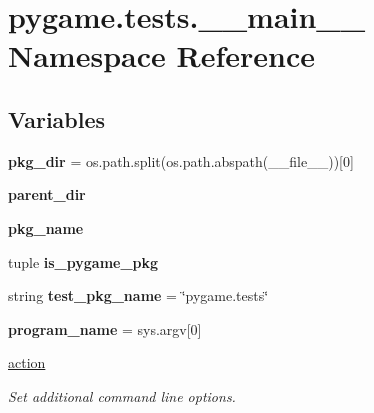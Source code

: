 \hypertarget{namespacepygame_1_1tests_1_1____main____}{}\section{pygame.\+tests.\+\_\+\+\_\+main\+\_\+\+\_\+ Namespace Reference}
\label{namespacepygame_1_1tests_1_1____main____}
\subsection*{Variables}
\begin{DoxyCompactItemize}
\item 
\mbox{\label{namespacepygame_1_1tests_1_1____main_____a0b126dcb9ca05eb1b7d15002869a48d6}} 
{\bfseries pkg\+\_\+dir} = os.\+path.\+split(os.\+path.\+abspath(\+\_\+\+\_\+file\+\_\+\+\_\+))\mbox{[}0\mbox{]}
\item 
\mbox{\label{namespacepygame_1_1tests_1_1____main_____a640893aa73124a470b9a003aece7f8cc}} 
{\bfseries parent\+\_\+dir}
\item 
\mbox{\label{namespacepygame_1_1tests_1_1____main_____a643a7c192dfca09b4612258ff8d8f1c6}} 
{\bfseries pkg\+\_\+name}
\item 
tuple {\bfseries is\+\_\+pygame\+\_\+pkg}
\item 
\mbox{\label{namespacepygame_1_1tests_1_1____main_____a890376449a5e0789ed280fc03ec8cb74}} 
string {\bfseries test\+\_\+pkg\+\_\+name} = \char`\"{}pygame.\+tests\char`\"{}
\item 
\mbox{\label{namespacepygame_1_1tests_1_1____main_____aca4db881dbe61a39da25b407e97ad110}} 
{\bfseries program\+\_\+name} = sys.\+argv\mbox{[}0\mbox{]}
\item 
\hyperlink{namespacepygame_1_1tests_1_1____main_____a451b974f602f9bb00c3cb2d41b6bccd8}{action}
\begin{DoxyCompactList}\small\item\em Set additional command line options. \end{DoxyCompactList}\item 

\end{DoxyCompactItemize}
